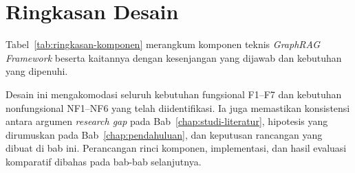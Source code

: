 


\section{Ringkasan Desain}
\label{sec:ringkasan-desain}

Tabel~\ref{tab:ringkasan-komponen} merangkum komponen teknis \emph{GraphRAG Framework} beserta kaitannya dengan kesenjangan yang dijawab dan kebutuhan yang dipenuhi.



Desain ini mengakomodasi seluruh kebutuhan fungsional F1--F7 dan kebutuhan nonfungsional NF1--NF6 yang telah diidentifikasi. Ia juga memastikan konsistensi antara argumen \emph{research gap} pada Bab~\ref{chap:studi-literatur}, hipotesis yang dirumuskan pada Bab~\ref{chap:pendahuluan}, dan keputusan rancangan yang dibuat di bab ini. Perancangan rinci komponen, implementasi, dan hasil evaluasi komparatif dibahas pada bab-bab selanjutnya.